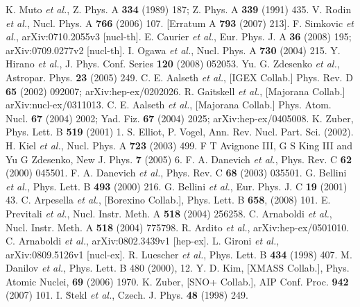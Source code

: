 \begin{thebibliography}{99}
K. Muto \textit{et al.}, Z. Phys. A \textbf{334} (1989) 187; Z. Phys. A \textbf{339} (1991) 435.
V. Rodin \textit{et al.}, Nucl. Phys. A \textbf{766} (2006) 107. [Erratum A \textbf{793} (2007) 213].
F. Simkovic \textit{et al.}, arXiv:0710.2055v3 [nucl-th].
E. Caurier \textit{et al.}, Eur. Phys. J. A \textbf{36} (2008) 195; arXiv:0709.0277v2 [nucl-th].
I. Ogawa \textit{et al.}, Nucl. Phys. A \textbf{730} (2004) 215.
Y. Hirano \textit{et al.}, J. Phys. Conf. Series \textbf{120} (2008) 052053.
Yu. G. Zdesenko \textit{et al.}, Astropar. Phys. \textbf{23} (2005) 249.
C. E. Aalseth \textit{et al.}, [IGEX Collab.] Phys. Rev. D \textbf{65} (2002) 092007; arXiv:hep-ex/0202026.
R. Gaitskell \textit{et al.}, [Majorana Collab.] arXiv:nucl-ex/0311013.
C. E. Aalseth \textit{et al.}, [Majorana Collab.] Phys. Atom. Nucl. \textbf{67} (2004) 2002; Yad. Fiz. \textbf{67} (2004) 2025; arXiv:hep-ex/0405008.
K. Zuber, Phys. Lett. B \textbf{519} (2001) 1.
S. Elliot, P. Vogel, Ann. Rev. Nucl. Part. Sci. (2002).
H. Kiel \textit{et al.}, Nucl. Phys. A \textbf{723} (2003) 499.
F T Avignone III, G S King III and Yu G Zdesenko, New J. Phys. \textbf{7} (2005) 6.
F. A. Danevich \textit{et al.}, Phys. Rev. C \textbf{62} (2000) 045501.
F. A. Danevich \textit{et al.}, Phys. Rev. C \textbf{68} (2003) 035501.
G. Bellini \textit{et al.}, Phys. Lett. B \textbf{493} (2000) 216.
G. Bellini \textit{et al.}, Eur. Phys. J. C \textbf{19} (2001) 43.
C. Arpesella \textit{et al.}, [Borexino Collab.], Phys. Lett. B \textbf{658}, (2008) 101.
E. Previtali \textit{et al.}, Nucl. Instr. Meth. A \textbf{518} (2004) 256258.
C. Arnaboldi \textit{et al.}, Nucl. Instr. Meth. A \textbf{518} (2004) 775798.
R. Ardito \textit{et al.}, arXiv:hep-ex/0501010.
C. Arnaboldi \textit{et al.}, arXiv:0802.3439v1 [hep-ex].
L. Gironi \textit{et al.}, arXiv:0809.5126v1 [nucl-ex].
R. Luescher \textit{et al.}, Phys. Lett. B \textbf{434} (1998) 407.
M. Danilov \textit{et al.}, Phys. Lett. B 480 (2000), 12.
Y. D. Kim, [XMASS Collab.], Phys. Atomic Nuclei, \textbf{69} (2006) 1970.
K. Zuber, [SNO+ Collab.], AIP Conf. Proc. \textbf{942} (2007) 101.
I. \u{S}tekl \textit{et al.}, Czech. J. Phys. \textbf{48} (1998) 249.

\end{thebibliography}
